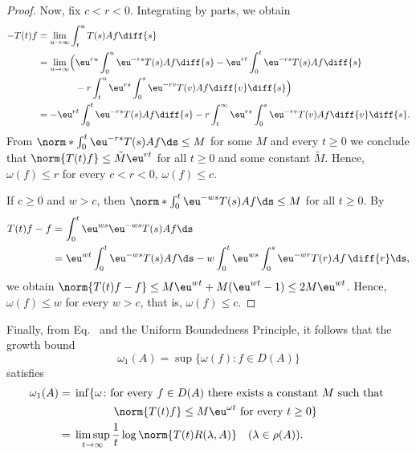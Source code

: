 \begin{proof}
Now, fix $c < r < 0$.
Integrating by parts, we obtain
\begin{align*}
-T(t)f 
  &= \lim_{u \to \infty} \int_{t}^{u} T(s)Af \diff{s}\\
  &= \lim_{u \to \infty} \Bigl( 
       \eu^{ru} \int_0^u \eu^{-rs} T(s) Af \diff{s} 
     - \eu^{rt} \int_0^t \eu^{-rs} T(s) Af \diff{s} \\
  &\hphantom{{}= \lim_{u \to \infty} \Bigl(}
     {}- r \int_t^u \eu^{rs} \int_0^s \eu^{-rv} T(v) Af \diff{v} \diff{s}
     \Bigr) \\
  &= - \eu^{rt} \int_0^t \eu^{-rs} T(s) Af \diff{s} 
     - r \int_t^\infty \eu^{rs} \int_0^s \eu^{-rv} T(v) Af \diff{v} \diff{s}.
\end{align*}
From $\norm*{\int_{0}^{t} \eu^{-r s} T(s)Af  \ds} \leq M$ for some $M$ and every $t \geq 0$ we conclude that $\norm{T(t)f} \leq \tilde{M}\eu^{rt}$ for all $t \geq 0$ and some constant $\tilde{M}$.
Hence, $\omega(f) \leq r$ for every $c < r < 0$, \ie $\omega(f) \leq c$.

If\/ $c \geq 0$ and $w > c$, then $\norm*{\int_{0}^{t} \eu^{-w s} T(s)Af \ds} \leq M$ for all $t \geq 0$. 
By 
\begin{align*}
T(t)f - f &= \int_{0}^{t} \eu^{w s} \eu^{-w s} T(s)Af  \ds\\
&= \eu^{wt}\int_0^t \eu^{-ws} T(s)Af \ds - w\int_0^t\eu^{ws}\int_0^s \eu^{-wr} T(r)Af\, \diff{r} \ds,
\end{align*}
we obtain $\norm{T(t)f-f} \leq M\eu^{w t} + M(\eu^{w t} - 1)
\le 2M\eu^{wt}$. 
Hence, $\omega(f)\le w$ for every $w > c$, that is, $\omega(f) \leq c$.
\end{proof}
Finally, from Eq.~ and the Uniform Boundedness Principle, it follows that the growth bound 
%
\[
	\omega_{1}(A) = \sup\{\omega(f) \colon f \in D(A)\}
\]
%
satisfies
\begin{equation}\label{eq:a4-1.3}
\begin{split}
\omega_1(A) &={} \inf \{ \omega \colon \text{for every  $f \in D(A)$  there exists a constant $ M $ such that  } \\
& \phantom{xxxxxxxx} \text{ $\norm{T(t)f} \leq M\eu^{\omega t}$  for every $t \geq 0$} \} \\
&={}
\limsup_{t \to \infty} \frac{1}{t} \log\norm{T(t)R(\lambda,A)} \quad (\lambda \in \rho(A)). 
\end{split}
\end{equation}
